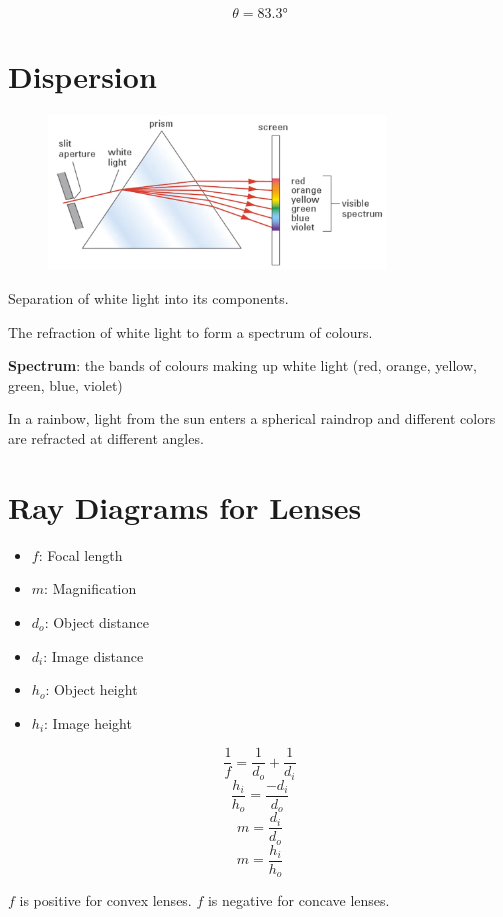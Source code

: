 \documentclass[a4paper,12pt]{article}
\begin{document}
$$\theta = \ang{83.3}$$

\pagebreak
\section{Dispersion}
\begin{figure}[H]
    \centering
    \includegraphics[width=0.8\textwidth]{dispersion}
\end{figure}

Separation of white light into its components.

The refraction of white light to form a spectrum of colours.

\textbf{Spectrum}: the bands of colours making up white light (red, orange, yellow, green, blue, violet)

In a rainbow, light from the sun enters a spherical raindrop and different colors are refracted at different angles.

\section{Ray Diagrams for Lenses}
\begin{itemize}
    \item{$f$: Focal length}
    \item{$m$: Magnification}
    \item{$d_o$: Object distance}
    \item{$d_i$: Image distance}
    \item{$h_o$: Object height}
    \item{$h_i$: Image height}
\end{itemize}

$$\frac{1}{f} = \frac{1}{d_o} + \frac{1}{d_i}$$
$$\frac{h_i}{h_o} = \frac{-d_i}{d_o}$$
$$m = \frac{d_i}{d_o}$$
$$m = \frac{h_i}{h_o}$$

$f$ is positive for convex lenses.
$f$ is negative for concave lenses.

\pagebreak
\end{document}
